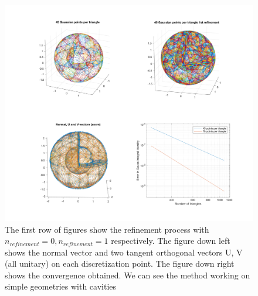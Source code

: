 \documentclass[11pt, oneside]{article}   	%
\begin{document}
\begin{figure}[H]
\begin{center}
\includegraphics[width=6in]{esfera_esfera.pdf}
\end{center}
\caption{The first row of figures show the refinement process with $n_{refinement}=0, n_{refinement}=1$ respectively.
The figure down left shows the normal vector and two tangent orthogonal vectors U, V (all unitary) on each discretization point. The figure down right shows the convergence obtained. We can see the method working on simple geometries with cavities}
\label{esfera_esfera}
\end{figure}
\end{document}
